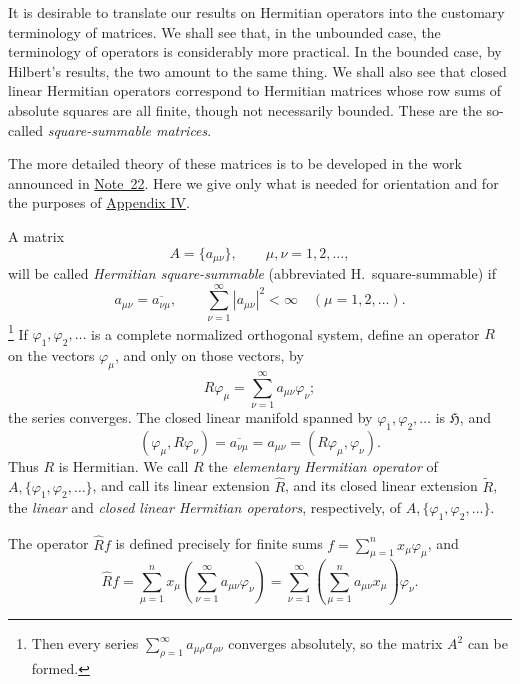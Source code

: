 ﻿\documentclass[paper=b5,fontsize=13pt,bookmarkpackage=false,twoside]{scrartcl}
\begin{document}
It is desirable to translate our results on Hermitian operators into
the customary terminology of matrices.  We shall see that, in the
unbounded case, the terminology of operators is considerably more
practical.  In the bounded case, by Hilbert's results, the two amount to
the same thing.  We shall also see that closed linear Hermitian
operators correspond to Hermitian matrices whose row sums of absolute
squares are all finite, though not necessarily bounded.  These are the
so-called \emph{square-summable matrices}.

The more detailed theory of these matrices is to be developed in the
work announced in \hyperref[fn:source-22]{Note~22}.  Here we give only what is needed for
orientation and for the purposes of \hyperref[app:IV]{Appendix IV}.

A matrix
\[
  A=\{a_{\mu\nu}\},\qquad \mu,\nu=1,2,\ldots,
\]
will be called \emph{Hermitian square-summable} (abbreviated
H.\ square-summable) if
\[
  a_{\mu\nu}=\overline{a_{\nu\mu}},
  \qquad
  \sum_{\nu=1}^{\infty}|a_{\mu\nu}|^2<\infty
  \quad(\mu=1,2,\ldots).
\]
\footnote{\label{fn:74}Then every series
\(\sum_{\rho=1}^{\infty}a_{\mu\rho}a_{\rho\nu}\) converges absolutely,
so the matrix \(A^2\) can be formed.}
If \(\varphi_1,\varphi_2,\ldots\) is a complete normalized orthogonal
system, define an operator \(R\) on the vectors \(\varphi_\mu\), and
only on those vectors, by
\[
  R\varphi_\mu
  =\sum_{\nu=1}^{\infty}a_{\mu\nu}\varphi_\nu;
\]
the series converges.  The closed linear manifold spanned by
\(\varphi_1,\varphi_2,\ldots\) is \(\mathfrak H\), and
\[
  (\varphi_\mu,R\varphi_\nu)
  =\overline{a_{\nu\mu}}
  =a_{\mu\nu}
  =(R\varphi_\mu,\varphi_\nu).
\]
Thus \(R\) is Hermitian.  We call \(R\) the \emph{elementary Hermitian
operator} of \(A,\{\varphi_1,\varphi_2,\ldots\}\), and call its linear
extension \(\widehat R\), and its closed linear extension
\(\widetilde R\), the \emph{linear} and \emph{closed linear Hermitian
operators}, respectively, of
\(A,\{\varphi_1,\varphi_2,\ldots\}\).

The operator \(\widehat Rf\) is defined precisely for finite sums
\(f=\sum_{\mu=1}^{n}x_\mu\varphi_\mu\), and
\[
 \widehat Rf
 =\sum_{\mu=1}^{n}x_\mu
      \left(\sum_{\nu=1}^{\infty}a_{\mu\nu}\varphi_\nu\right)
 =\sum_{\nu=1}^{\infty}
      \left(\sum_{\mu=1}^{n}a_{\mu\nu}x_\mu\right)\varphi_\nu.
\]
\end{document}
